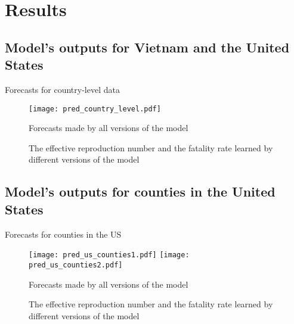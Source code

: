 \section{Results}

\subsection{Model's outputs for Vietnam and the United States}

\begin{frame}[allowframebreaks]{Forecasts for country-level data}

    \begin{figure}[!htb]
        \centering
        \texttt{[image: pred\_country\_level.pdf]}
        \caption{Forecasts made by all versions of the model}
    \end{figure}

    \framebreak

    \begin{figure}[!htb]
        \centering
        \caption{The effective reproduction number and the fatality rate learned by different versions of the model}
    \end{figure}

\end{frame}

\subsection{Model's outputs for counties in the United States}

\begin{frame}[allowframebreaks]{Forecasts for counties in the US}

    \begin{figure}[!htb]
        \centering
        \texttt{[image: pred\_us\_counties1.pdf]}
        \texttt{[image: pred\_us\_counties2.pdf]}
        \caption{Forecasts made by all versions of the model}
    \end{figure}

    \framebreak

    \begin{figure}[!htb]
        \centering
        \caption{The effective reproduction number and the fatality rate learned by different versions of the model}
    \end{figure}

\end{frame}

